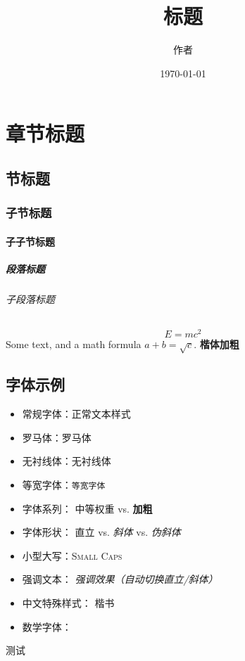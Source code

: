 \documentclass[12pt, a4paper, oneside, scheme=chinese,fontset=yanming]{ctexbook}
\author{作者}
\title{标题}
\date{\today}
\begin{document}
\chapter{章节标题}

\section{节标题}

\subsection{子节标题}

\subsubsection{子子节标题}

\paragraph{段落标题} 
\subparagraph{子段落标题}
\begin{equation}
    E = mc^2
\end{equation}
Some text, and a math formula \(a+b=\sqrt{c}\).
\textbf{\textsf 楷体加粗}
\section{字体示例}
\begin{itemize}
    \item 常规字体：正常文本样式
    \item 罗马体：\textrm{罗马体}
    \item 无衬线体：\textsf{无衬线体}
    \item 等宽字体：\texttt{等宽字体}
    
    \item 字体系列：
    \textmd{中等权重} vs. \textbf{加粗}
    
    \item 字体形状：
    \textup{直立} vs. \textit{斜体} vs. \textsl{伪斜体}
    
    \item 小型大写：\textsc{Small Caps}
    
    \item 强调文本：
    \emph{强调效果（自动切换直立/斜体）}
    
    \item 中文特殊样式：
    {\kaiti 楷书}      
    
    \item 数学字体：
\end{itemize}

测试
\end{document}
